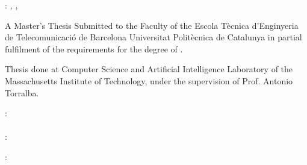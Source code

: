 \thispagestyle{empty}

\hfill

\vfill

\noindent\myName: \textit{\myTitle,} \mySubtitle, %
\textcopyright\ \myTime

\bigskip

\noindent A Master's Thesis Submitted to the Faculty of the Escola Tècnica d'Enginyeria de Telecomunicació de Barcelona Universitat Politècnica de Catalunya in partial fulfilment of the requirements for the degree of .

\medskip

\noindent Thesis done at Computer Science and Artificial Intelligence Laboratory of the Massachusetts Institute of Technology, under the supervision of Prof. Antonio Torralba.

\medskip 

\noindent{}: \\
\mySupervisor \\
\medskip
\noindent{}: \\
\myProf

\medskip

\noindent{}: \\
\myLocation


